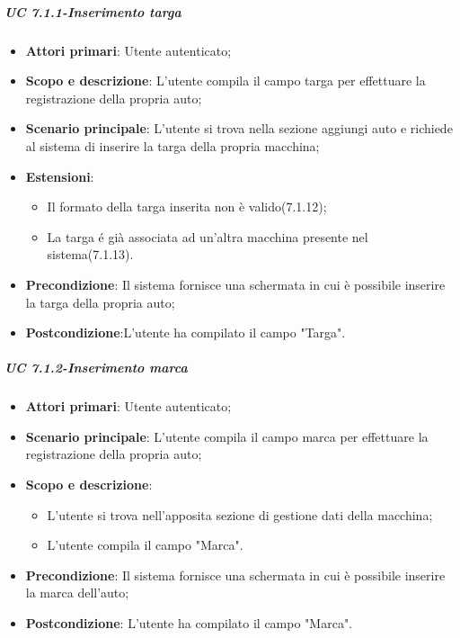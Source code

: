     \subparagraph{UC 7.1.1-Inserimento targa}
    \begin{itemize}
                \item \textbf{Attori primari}: Utente autenticato;
                
                 \item \textbf{Scopo e descrizione}: L'utente compila il campo targa per effettuare la registrazione della propria auto;
                 \item \textbf{Scenario principale}: L'utente si trova nella sezione aggiungi auto e richiede al sistema di inserire la targa della propria macchina;
                 \item \textbf{Estensioni}: 
                 \begin{itemize}
                 \item Il formato della targa inserita non è valido(7.1.12);
                 \item La targa é già associata ad un'altra macchina presente nel sistema(7.1.13).
                 \end{itemize}
                 \item \textbf{Precondizione}: Il sistema fornisce una schermata in cui è possibile inserire la targa della propria auto;
                 \item \textbf{Postcondizione}:L’utente ha compilato il campo "Targa".
                 \end{itemize}
                 
    
                 
    \subparagraph{UC 7.1.2-Inserimento marca}
    \begin{itemize}
                \item \textbf{Attori primari}: Utente autenticato;
                
                 \item \textbf{Scenario principale}: L'utente compila il campo marca per effettuare la registrazione della propria auto;
                 \item \textbf{Scopo e descrizione}: 
                 \begin{itemize}
                     \item L'utente si trova nell'apposita sezione di gestione dati della macchina;
                     \item L'utente compila il campo "Marca".
                 \end{itemize}
                 \item \textbf{Precondizione}: Il sistema fornisce una schermata in cui è possibile inserire la marca dell'auto;
                 \item \textbf{Postcondizione}: L'utente ha compilato il campo "Marca".
                 \end{itemize}
                 
